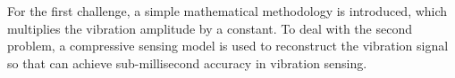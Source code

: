 For the first challenge, a simple mathematical methodology is introduced, which multiplies the vibration amplitude by a constant. To deal with the second problem, a compressive sensing model is used to reconstruct the vibration signal so that can achieve sub-millisecond accuracy in vibration sensing.
